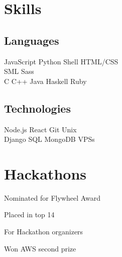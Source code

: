 \documentclass[]{deedy-resume-openfont}
\begin{document}
\begin{minipage}[t]{0.33\textwidth}

\section{Skills}
\subsection{Languages}
JavaScript \textbullet{} Python \textbullet{} Shell \textbullet{}  HTML/CSS \\
SML \textbullet{} Sass \\
C \textbullet{} C++ \textbullet{} Java \textbullet{} Haskell \textbullet{} Ruby \\
\sectionsep

\subsection{Technologies}
Node.js \textbullet{} React \textbullet{} Git \textbullet{} Unix \\
Django \textbullet{} SQL \textbullet{} MongoDB \textbullet{} VPSs
\sectionsep


\section{Hackathons}
\vspace{\topsep} %
\begin{tightemize}
\item Nominated for Flywheel Award
\end{tightemize}


\begin{tightemize}
\item Placed in top 14
\end{tightemize}


\begin{tightemize}
\item For Hackathon organizers
\end{tightemize}

\begin{tightemize}
\item Won AWS second prize
\end{tightemize}

\sectionsep

%
%

\end{minipage}
\end{document}
